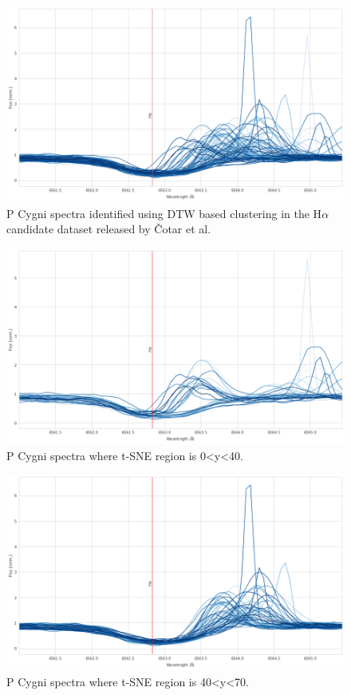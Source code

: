 \begin{figure}[!htb]
\centering
\includegraphics[scale=0.45]{figures/pcygni.png}
\caption{P Cygni spectra identified using DTW based clustering in the H$\alpha$ candidate dataset released by Čotar et al.}
\end{figure}


\begin{figure}[!htb]
\centering
\includegraphics[scale=0.45]{figures/spectra less than 40.png}
\caption{P Cygni spectra where t-SNE region is 0<y<40. }
\end{figure}

\begin{figure}[!htb]
\centering
\includegraphics[scale=0.45]{figures/spectra greater than 40.png}
\caption{P Cygni spectra where t-SNE region is 40<y<70. }
\end{figure}

